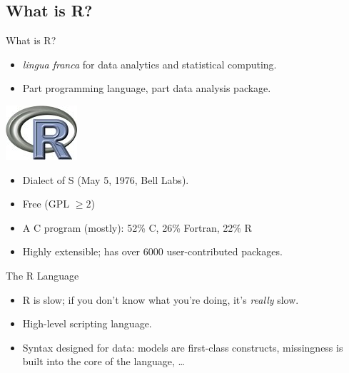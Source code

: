 \subsection{What is R?}
\makesubcontentsslidessec


\begin{frame}
  \begin{block}{What is R?}\pause
  \begin{minipage}{.675\textwidth}
  \begin{itemize}[<+-|alert@+>]
    \item \emph{lingua franca} for data analytics and statistical computing.
    \item Part programming language, part data analysis package.
  \end{itemize}
  \end{minipage}
  \hfill
  \begin{minipage}{.3\textwidth}
    \centering\includegraphics[scale=.85]{../common/pics/Rlogo}
  \end{minipage}
  \begin{itemize}
    \item Dialect of S (May 5, 1976, Bell Labs).
    \item Free (GPL $\geq 2$)
    \item A C program (mostly): 52\% C, 26\% Fortran, 22\% R
    \item Highly extensible; has over 6000 user-contributed packages.
  \end{itemize}
\end{block}
\end{frame}








\begin{frame}
\begin{block}{The R Language}\pause
\begin{itemize}
  \item R is slow; if you don't know what you're doing, it's \emph{really} slow.
  \item High-level scripting language.
  \item Syntax designed for data: models are first-class constructs,
missingness is built into the core of the language, \dots
\end{itemize}
\end{block}
\end{frame}



